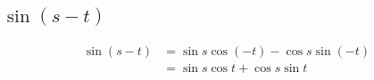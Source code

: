 \documentclass{exam}
\begin{document}
  \subsection{$\sin(s - t)$}
  \begin{align*}
    \sin(s - t) & = \sin s \cos (-t) - \cos s \sin (-t) \\
                & = \sin s \cos t + \cos s \sin t \\
  \end{align*}
\end{document}
